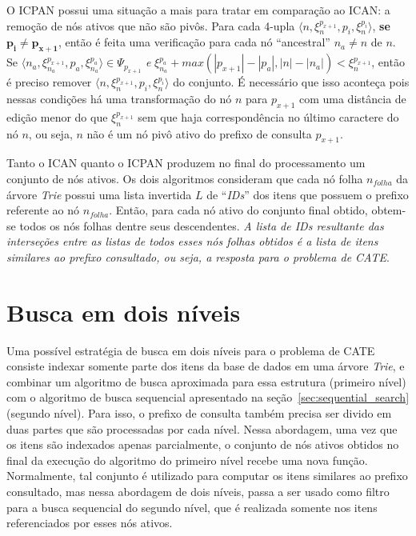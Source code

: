 O ICPAN possui uma situação a mais para tratar em comparação ao ICAN: a remoção de nós ativos que não são pivôs. Para cada 4-upla $\langle n, \xi_{n}^{p_{x + 1}}, p_{i}, \xi_{n}^{p_{i}} \rangle$, \textbf{se $\mathbf{p_{i} \neq p_{x+1}}$}, então é feita uma verificação para cada nó ``ancestral'' $n_{a} \neq n$ de $n$. Se $\langle n_{a}, \xi_{n_{a}}^{p_{x + 1}}, p_{a}, \xi_{n_{a}}^{p_{a}} \rangle \in \Psi_{p_{x+1}}$ \textit{e} $\xi_{n_{a}}^{p_{a}} + max(|p_{x+1}| - |p_{a}|, |n| - |n_{a}|) < \xi_{n}^{p_{x+1}}$, então é preciso remover $\langle n, \xi_{n}^{p_{x + 1}}, p_{i}, \xi_{n}^{p_{i}} \rangle$ do conjunto. É necessário que isso aconteça pois nessas condições há uma transformação do nó $n$ para $p_{x+1}$ com uma distância de edição menor do que $\xi_{n}^{p_{x+1}}$ sem que haja correspondência no último caractere do nó $n$, ou seja, $n$ não é um nó pivô ativo do prefixo de consulta $p_{x+1}$.

Tanto o ICAN quanto o ICPAN produzem no final do processamento um conjunto de nós ativos. Os dois algoritmos consideram que cada nó folha $n_{folha}$ da árvore \textit{Trie} possui uma lista invertida $L$ de ``\textit{IDs}'' dos itens que possuem o prefixo referente ao nó $n_{folha}$. Então, para cada nó ativo do conjunto final obtido, obtem-se todos os nós folhas dentre seus descendentes. \textit{A lista de \textit{IDs} resultante das interseções entre as listas de todos esses nós folhas obtidos é a lista de itens similares ao prefixo consultado, ou seja, a resposta para o problema de CATE}.

\section{Busca em dois níveis}

Uma possível estratégia de busca em dois níveis para o problema de CATE consiste indexar somente parte dos itens da base de dados em uma árvore \textit{Trie}, e combinar um algoritmo de busca aproximada para essa estrutura (primeiro nível) com o algoritmo de busca sequencial apresentado na seção~\ref{sec:sequential_search} (segundo nível). Para isso, o prefixo de consulta também precisa ser divido em duas partes que são processadas por cada nível. Nessa abordagem, uma vez que os itens são indexados apenas parcialmente, o conjunto de nós ativos obtidos no final da execução do algoritmo do primeiro nível recebe uma nova função. Normalmente, tal conjunto é utilizado para computar os itens similares ao prefixo consultado, mas nessa abordagem de dois níveis, passa a ser usado como filtro para a busca sequencial do segundo nível, que é realizada somente nos itens referenciados por esses nós ativos.
 
